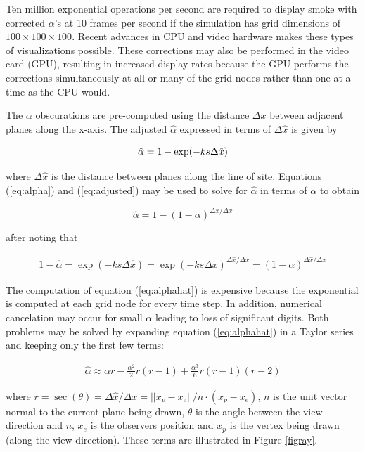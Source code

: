 Ten million exponential operations per second are required to display smoke with corrected $\alpha$'s at 10 frames per second if the simulation has grid dimensions of $100\times 100\times 100$. Recent advances in CPU and video hardware makes these types of visualizations possible. These corrections may also be performed in the video card (GPU), resulting in increased display rates because the GPU performs the corrections simultaneously at all or many of the grid nodes rather than one at a time as the CPU would.

The $\alpha$ obscurations are pre-computed using the distance $\Delta x$ between adjacent planes along the x-axis. The adjusted $\hat{\alpha}$ expressed in terms of $\Delta\hat{x}$ is given by

\begin{equation}
\label{eq:adjusted}
\hat{\alpha}=1-\exp(-ks\Delta \hat{x})\\
\end{equation}

where $\Delta\hat{x}$ is the distance between planes along the line of site.  Equations (\ref{eq:alpha}) and (\ref{eq:adjusted}) may be used to solve for $\hat{\alpha}$ in terms of $\alpha$ to obtain

\begin{equation}
\label{eq:alphahat}
\hat{\alpha}=1-(1-\alpha)^{\Delta\hat{x}/\Delta x}
\end{equation}

after noting that

\begin{eqnarray*}
1-\hat{\alpha}=\exp(-ks\Delta\hat{x})=\exp(-ks\Delta
x)^{\Delta\hat{x}/\Delta x}=(1-\alpha)^{\Delta\hat{x}/\Delta x}
\end{eqnarray*}

The computation of equation (\ref{eq:alphahat}) is expensive because the exponential is computed at each grid node for every time step.  In addition, numerical cancelation may occur for small $\alpha$ leading to loss of significant digits. Both problems may be solved by expanding equation (\ref{eq:alphahat}) in a Taylor series and keeping only the first few terms:

\begin{eqnarray*}
\hat{\alpha}\approx \alpha r -
\frac{\alpha^2}{2}r(r-1)+\frac{\alpha^3}{6}r(r-1)(r-2)
\end{eqnarray*}

where $r=\sec(\theta)=\Delta \hat{x}/\Delta x=||x_p-x_e||/n\cdot(x_p-x_e)$, $n$ is the unit vector normal to the current plane being drawn, $\theta$ is the angle between the view direction and $n$, $x_e$ is the observers position and $x_p$ is the vertex being drawn (along the view direction).  These terms are illustrated in Figure \ref{figray}.


